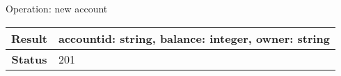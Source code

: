 \begin{frame}{Operation: new account}
  \centering
  \begin{tabular}{| c | l |}
    \hline
    \textbf{Result}    & accountid: string, balance: integer, owner: string\\ \hline
    \textbf{Status}    & 201 \\ \hline
  \end{tabular}
  \centering
  \inputminted{js}{./code/example2_new_account_response.jsch}
\end{frame}




